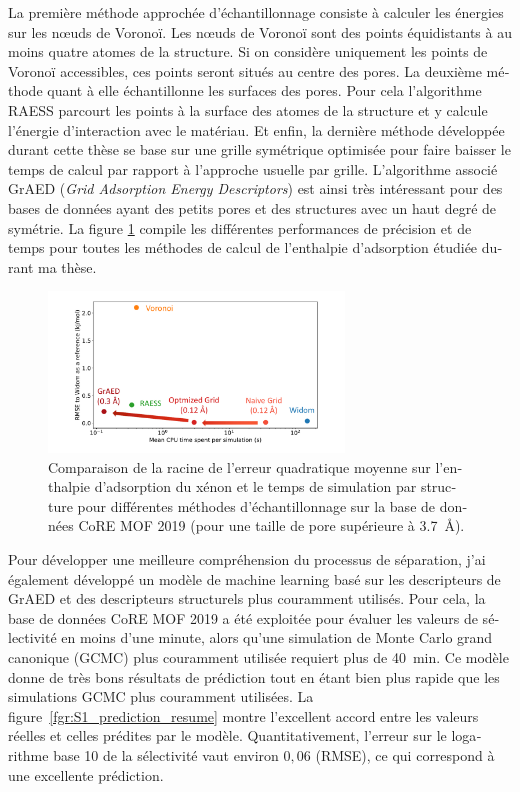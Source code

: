 \documentclass[thesis]{subfiles}
\begin{document}
\begin{otherlanguage}{french}
La première méthode approchée d'échantillonnage consiste à calculer les énergies sur les {n\oe{}uds} de Voronoï. Les n\oe{}uds de Voronoï sont des points équidistants à au moins quatre atomes de la structure. Si on considère uniquement les points de Voronoï accessibles, ces points seront situés au centre des pores. La deuxième méthode quant à elle échantillonne les surfaces des pores. Pour cela l'algorithme RAESS parcourt les points à la surface des atomes de la structure et y calcule l'énergie d'interaction avec le matériau. Et enfin, la dernière méthode développée durant cette thèse se base sur une grille symétrique optimisée pour faire baisser le temps de calcul par rapport à l'approche usuelle par grille. L'algorithme associé GrAED (\emph{Grid Adsorption Energy Descriptors}) est ainsi très intéressant pour des bases de données ayant des petits pores et des structures avec un haut degré de symétrie. La figure \ref{fgr:grid_perfomance_resume} compile les différentes performances de précision et de temps pour toutes les méthodes de calcul de l'enthalpie d'adsorption étudiée durant ma thèse.

\begin{figure}[ht]
\centering
    \includegraphics[width=0.7\textwidth]{figures/3-fastsim/Grid_sumup.pdf}
    \caption{Comparaison de la racine de l'erreur quadratique moyenne sur l'enthalpie d'adsorption du xénon et le temps de simulation par structure pour différentes méthodes d'échantillonnage  sur la base de données CoRE MOF 2019 (pour une taille de pore supérieure à \SI{3.7}{\angstrom}). }\label{fgr:grid_perfomance_resume}
\end{figure}

Pour développer une meilleure compréhension du processus de séparation, j'ai également développé un modèle de machine learning basé sur les descripteurs de GrAED et des descripteurs structurels plus couramment utilisés. Pour cela, la base de données CoRE MOF 2019 a été exploitée pour évaluer les valeurs de sélectivité en moins d'une minute, alors qu'une simulation de Monte Carlo grand canonique (GCMC) plus couramment utilisée requiert plus de \SI{40}{\minute}. 
Ce modèle donne de très bons résultats de prédiction tout en étant bien plus rapide que les simulations GCMC plus couramment utilisées. La figure~\ref{fgr:S1_prediction_resume} montre l'excellent accord entre les valeurs réelles et celles prédites par le modèle. Quantitativement, l'erreur sur le logarithme base 10 de la sélectivité vaut environ $0,06$ (RMSE), ce qui correspond à une excellente prédiction. 


\end{otherlanguage}
\end{document}
